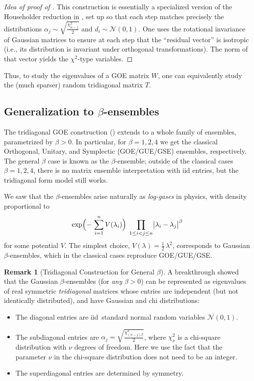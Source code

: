 \documentclass[letterpaper,11pt,oneside,reqno]{article}
\numberwithin{equation}{section}
\theoremstyle{definition}
\newtheorem{remark}[proposition]{Remark}
\begin{document}
\begin{proof}[Idea of proof of ]
	This construction is essentially a specialized version of
	the Householder reduction in , set up
	so that each step matches precisely the distributions
	\(\alpha_j\sim \sqrt{\tfrac{\chi^2_{n-j}}{2}}\) and
	\(d_i\sim\mathcal{N}(0,1)\).  One uses the rotational
	invariance of Gaussian matrices to ensure at each step that
	the ``residual vector'' is isotropic (i.e., its distribution
	is invariant under orthogonal transformations).  The norm
	of that vector yields the \(\chi^2\)-type variables.
\end{proof}

Thus, to study the eigenvalues of a GOE matrix \(W\), one can equivalently study the (much sparser) random tridiagonal matrix \(T\).

\subsection{Generalization to \(\beta\)-ensembles}

The tridiagonal GOE construction ()
extends to a whole family of ensembles, parametrized by
\(\beta>0\).  In particular, for \(\beta = 1, 2, 4\) we get
the classical Orthogonal, Unitary, and Symplectic
(GOE/GUE/GSE) ensembles, respectively.  The general
$\beta$ case is known as the \(\beta\)-ensemble; 
outside of the classical cases $\beta=1,2,4$, there
is no matrix ensemble interpretation with iid entries,
but the tridiagonal form model still works.

We saw that
the \(\beta\)-ensembles arise naturally as
\emph{log-gases} in physics, with density 
proportional to
\[
  \exp\Bigl(-\,\sum_{i=1}^n V(\lambda_i)\Bigr)
  \;\prod_{1\le i<j\le n}\bigl|\lambda_i - \lambda_j\bigr|^\beta
\]
for some potential \(V\).  The simplest choice, \(V(\lambda)=\tfrac12\,\lambda^2\), corresponds to Gaussian \(\beta\)-ensembles, which in the classical cases reproduce GOE/GUE/GSE.

\begin{remark}[Tridiagonal Construction for General \(\beta\)]
	A breakthrough \cite{dumitriu2002matrix} showed that the
	Gaussian \(\beta\)-ensembles (for \emph{any} \(\beta>0\))
	can be represented 
	as eigenvalues of real symmetric
	\emph{tridiagonal} matrices
	whose entries
	are independent 
	(but not identically distributed), and have 
	Gaussian and chi distributions: 
\begin{itemize}
\item The diagonal entries are iid\ 
	standard normal random variables $\mathcal{N}(0,1)$.
\item The subdiagonal entries are
	$\alpha_j = \sqrt{\frac{\chi^2_{(n-j)\beta}}{2}}$,
	where $\chi^2_{\nu}$ is a chi-square distribution with $\nu$ degrees of freedom.
	Here we use the fact that the parameter $\nu$ in the chi-square distribution does not need to be an integer.
\item The superdiagonal entries are
	determined by symmetry.
\end{itemize}
\end{remark}
\end{document}
